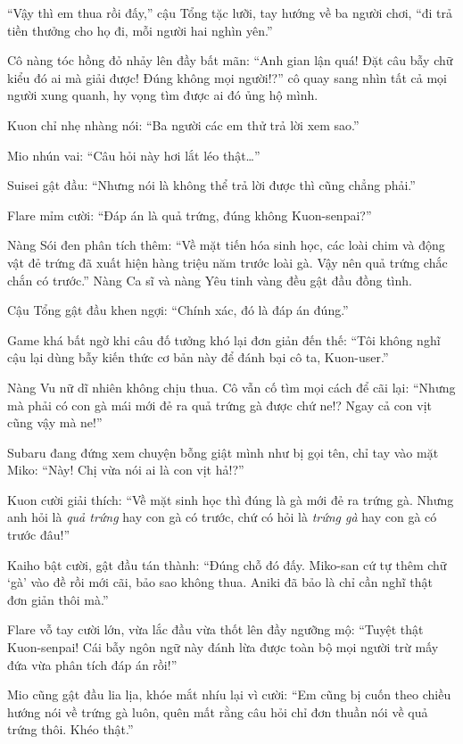 \documentclass[../main.tex]{subfiles}
\begin{document}
``Vậy thì em thua rồi đấy,'' cậu Tổng tặc lưỡi, tay hướng về ba người chơi, ``đi trả tiền thưởng cho họ đi, mỗi người hai nghìn yên.''

Cô nàng tóc hồng đỏ nhảy lên đầy bất mãn: ``Anh gian lận quá! Đặt câu bẫy chữ kiểu đó ai mà giải được! Đúng không mọi người!?'' cô quay sang nhìn tất cả mọi người xung quanh, hy vọng tìm được ai đó ủng hộ mình.

Kuon chỉ nhẹ nhàng nói: ``Ba người các em thử trả lời xem sao.''

Mio nhún vai: ``Câu hỏi này hơi lắt léo thật\dots''

Suisei gật đầu: ``Nhưng nói là không thể trả lời được thì cũng chẳng phải.''

Flare mỉm cười: ``Đáp án là quả trứng, đúng không Kuon-senpai?''

Nàng Sói đen phân tích thêm: ``Về mặt tiến hóa sinh học, các loài chim và động vật đẻ trứng đã xuất hiện hàng triệu năm trước loài gà. Vậy nên quả trứng chắc chắn có trước.'' Nàng Ca sĩ và nàng Yêu tinh vàng đều gật đầu đồng tình.

Cậu Tổng gật đầu khen ngợi: ``Chính xác, đó là đáp án đúng.''

Game khá bất ngờ khi câu đố tưởng khó lại đơn giản đến thế: ``Tôi không nghĩ cậu lại dùng bẫy kiến thức cơ bản này để đánh bại cô ta, Kuon-user.''

Nàng Vu nữ dĩ nhiên không chịu thua. Cô vẫn cố tìm mọi cách để cãi lại: ``Nhưng mà phải có con gà mái mới đẻ ra quả trứng gà được chứ ne!? Ngay cả con vịt cũng vậy mà ne!''

Subaru đang đứng xem chuyện bỗng giật mình như bị gọi tên, chỉ tay vào mặt Miko: ``Này! Chị vừa nói ai là con vịt hả!?''

Kuon cười giải thích: ``Về mặt sinh học thì đúng là gà mới đẻ ra trứng gà. Nhưng anh hỏi là \emph{quả trứng} hay con gà có trước, chứ có hỏi là \emph{trứng gà} hay con gà có trước đâu!''

Kaiho bật cười, gật đầu tán thành: ``Đúng chỗ đó đấy. Miko-san cứ tự thêm chữ `gà' vào đề rồi mới cãi, bảo sao không thua. Aniki đã bảo là chỉ cần nghĩ thật đơn giản thôi mà.''

Flare vỗ tay cười lớn, vừa lắc đầu vừa thốt lên đầy ngưỡng mộ: ``Tuyệt thật Kuon-senpai! Cái bẫy ngôn ngữ này đánh lừa được toàn bộ mọi người trừ mấy đứa vừa phân tích đáp án rồi!''

Mio cũng gật đầu lia lịa, khóe mắt nhíu lại vì cười: ``Em cũng bị cuốn theo chiều hướng nói về trứng gà luôn, quên mất rằng câu hỏi chỉ đơn thuần nói về quả trứng thôi. Khéo thật.''
\end{document}
